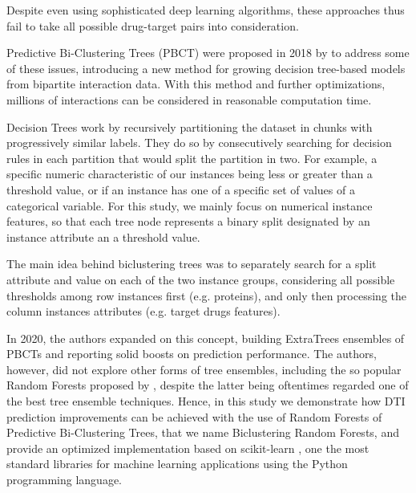 Despite even using sophisticated deep learning algorithms, these approaches thus
fail to take all possible drug-target pairs into consideration.

Predictive Bi-Clustering Trees (PBCT) were proposed in 2018 by
\cite{Pliakos_2018} to address some of these issues, introducing a new method
for growing decision tree-based models from bipartite interaction data. With
this method and further optimizations, millions of interactions can be
considered in reasonable computation time.

Decision Trees work by recursively partitioning the dataset in chunks with
progressively similar labels\cite{Breiman_1984, Quinlan_1996}. They do so by
consecutively searching for decision rules in each partition that would split
the partition in two. For example, a specific numeric characteristic of our
instances being less or greater than a threshold value, or if an instance has
one of a specific set of values of a categorical variable. For this study, we
mainly focus on numerical instance features, so that each tree node represents a
binary split designated by an instance attribute an a threshold value.

The main idea behind biclustering trees was to separately search for a split
attribute and value on each of the two instance groups, considering all possible
thresholds among row instances first (e.g. proteins), and only then processing
the column instances attributes (e.g. target drugs features).  \par In 2020, the
authors expanded on this concept, building ExtraTrees ensembles of PBCTs
\cite{Pliakos_2020} and reporting solid boosts on prediction performance. The
authors, however, did not explore other forms of tree ensembles, including the
so popular Random Forests proposed by \cite{Breiman_2001}, despite the latter
being oftentimes regarded one of the best tree ensemble
techniques\cite{Huang_2021, Amasyali_2011, Hall_2003, Banfield_2007}. Hence, in
this study we demonstrate how DTI prediction improvements can be achieved with
the use of Random Forests of Predictive Bi-Clustering Trees, that we name
Biclustering Random Forests, and provide an optimized implementation based on
scikit-learn \cite{scikit-learn}, one the most standard libraries for machine
learning applications using the Python\cite{python} programming language.

